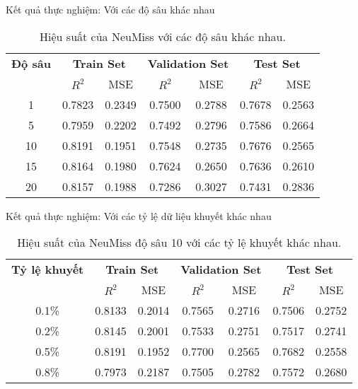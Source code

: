 \begin{frame}{Kết quả thực nghiệm: Với các độ sâu khác nhau}
\begin{table}[h!]
\centering
\setlength{\tabcolsep}{8pt}
\begin{tabular}{ccccccc}
\toprule
\textbf{Độ sâu} & \multicolumn{2}{c}{\textbf{Train Set}} & \multicolumn{2}{c}{\textbf{Validation Set}} & \multicolumn{2}{c}{\textbf{Test Set}} \\
\cmidrule(lr){2-3}\cmidrule(lr){4-5}\cmidrule(lr){6-7}
 & $R^2$ & MSE & $R^2$ & MSE & $R^2$ & MSE \\
\midrule
1  & 0.7823 & 0.2349 & 0.7500 & 0.2788 & 0.7678 & 0.2563 \\
5  & 0.7959 & 0.2202 & 0.7492 & 0.2796 & 0.7586 & 0.2664 \\
10 & 0.8191 & 0.1951 & 0.7548 & 0.2735 & 0.7676 & 0.2565 \\
15 & 0.8164 & 0.1980 & 0.7624 & 0.2650 & 0.7636 & 0.2610 \\
20 & 0.8157 & 0.1988 & 0.7286 & 0.3027 & 0.7431 & 0.2836 \\
\bottomrule
\end{tabular}
\caption{Hiệu suất của NeuMiss với các độ sâu khác nhau.}
\label{tab:performance-depths}
\end{table}
\end{frame}

\begin{frame}{Kết quả thực nghiệm: Với các tỷ lệ dữ liệu khuyết khác nhau}
\begin{table}[h!]
\centering
\setlength{\tabcolsep}{8pt}
\begin{tabular}{ccccccc}
\toprule
\textbf{Tỷ lệ khuyết} & \multicolumn{2}{c}{\textbf{Train Set}} & \multicolumn{2}{c}{\textbf{Validation Set}} & \multicolumn{2}{c}{\textbf{Test Set}} \\
\cmidrule(lr){2-3}\cmidrule(lr){4-5}\cmidrule(lr){6-7}
  & $R^2$ & MSE & $R^2$ & MSE & $R^2$ & MSE \\
\midrule
0.1\% & 0.8133 & 0.2014 & 0.7565 & 0.2716 & 0.7506 & 0.2752 \\
0.2\% & 0.8145 & 0.2001 & 0.7533 & 0.2751 & 0.7517 & 0.2741 \\
0.5\% & 0.8191 & 0.1952 & 0.7700 & 0.2565 & 0.7682 & 0.2558 \\
0.8\% & 0.7973 & 0.2187 & 0.7505 & 0.2782 & 0.7572 & 0.2680 \\
\bottomrule
\end{tabular}
\caption{Hiệu suất của NeuMiss độ sâu 10 với các tỷ lệ khuyết khác nhau.}
\label{tab:performance_missing_rates}
\end{table}

\end{frame}


